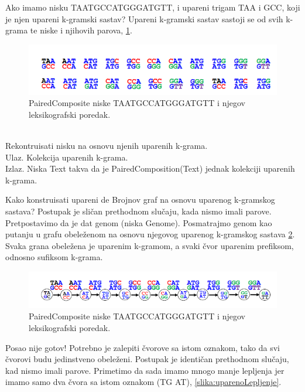 Ako imamo nisku TAATGCCATGGGATGTT, i upareni trigam TAA i GCC, koji je njen upareni k-gramski sastav? Upareni k-gramski sastav sastoji se od svih k-grama te niske i njihovih parova, \ref{slika:upareni3}.


\begin{figure}[H]
	\centering
	\includegraphics[width=1\textwidth]{poglavlja/3/slike/upareni_3gram.png}
	\caption{PairedComposite niske TAATGCCATGGGATGTT i njegov leksikografski poredak.}
	\label{slika:upareni3}
\end{figure} 


\begin{problem} 
	~\\ Rekontruisati nisku na osnovu njenih uparenih k-grama.
	\\ Ulaz. Kolekcija uparenih k-grama.
	\\ Izlaz. Niska Text takva da je PairedComposition(Text) jednak kolekciji uparenih k-grama. 
\end{problem}

Kako konstruisati upareni de Brojnov graf na osnovu uparenog k-gramskog sastava? Postupak je sličan prethodnom slučaju, kada nismo imali parove. Pretpostavimo da je dat genom (niska Genome). Posmatrajmo genom kao putanju u grafu obeleženom na osnovu njegovog uparenog k-gramskog sastava \ref{slika:upareniDeBrojnov}. Svaka grana obeležena je uparenim k-gramom, a svaki čvor uparenim prefiksom, odnosno sufiksom k-grama.


\begin{figure}[H]
	\centering
	\includegraphics[width=1\textwidth]{poglavlja/3/slike/upareni_debrojnov.png}
	\caption{PairedComposite niske TAATGCCATGGGATGTT i njegov leksikografski poredak.}
	\label{slika:upareniDeBrojnov}
\end{figure} 

Posao nije gotov! Potrebno je zalepiti čvorove sa istom oznakom, tako da svi čvorovi budu jedinstveno obeleženi. Postupak je identičan prethodnom slučaju, kad nismo imali parove. Primetimo da sada imamo mnogo manje lepljenja jer imamo samo dva čvora sa istom oznakom (TG AT), \ref{slika:uparenoLepljenje}.


